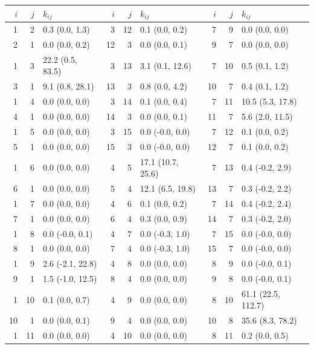 \begin{table}
 \centering
 \label{tab:base_case_rate_matrix}
 \begin{tabular}{|rrl||rrl||rrl|}
 \hline
 $i$ & $j$ &  $k_{ij}$ & $i$ & $j$ &  $k_{ij}$ & $i$ & $j$ &  $k_{ij}$ \\
 \hline\hline
 1 & 2 & 0.3 (0.0, 1.3) & 3 & 12 & 0.1 (0.0, 0.2) & 7 & 9 & 0.0 (0.0, 0.0) \\
 2 & 1 & 0.0 (0.0, 0.2) & 12 & 3 & 0.0 (0.0, 0.1) & 9 & 7 & 0.0 (0.0, 0.0) \\
 1 & 3 & 22.2 (0.5, 83.5) & 3 & 13 & 3.1 (0.1, 12.6) & 7 & 10 & 0.5 (0.1, 1.2) \\
 3 & 1 & 9.1 (0.8, 28.1) & 13 & 3 & 0.8 (0.0, 4.2) & 10 & 7 & 0.4 (0.1, 1.2) \\
 1 & 4 & 0.0 (0.0, 0.0) & 3 & 14 & 0.1 (0.0, 0.4) & 7 & 11 & 10.5 (5.3, 17.8) \\
 4 & 1 & 0.0 (0.0, 0.0) & 14 & 3 & 0.0 (0.0, 0.1) & 11 & 7 & 5.6 (2.0, 11.5) \\
 1 & 5 & 0.0 (0.0, 0.0) & 3 & 15 & 0.0 (-0.0, 0.0) & 7 & 12 & 0.1 (0.0, 0.2) \\
 5 & 1 & 0.0 (0.0, 0.0) & 15 & 3 & 0.0 (-0.0, 0.0) & 12 & 7 & 0.1 (0.0, 0.2) \\
 1 & 6 & 0.0 (0.0, 0.0) & 4 & 5 & 17.1 (10.7, 25.6) & 7 & 13 & 0.4 (-0.2, 2.9) \\
 6 & 1 & 0.0 (0.0, 0.0) & 5 & 4 & 12.1 (6.5, 19.8) & 13 & 7 & 0.3 (-0.2, 2.2) \\
 1 & 7 & 0.0 (0.0, 0.0) & 4 & 6 & 0.1 (0.0, 0.2) & 7 & 14 & 0.4 (-0.2, 2.4) \\
 7 & 1 & 0.0 (0.0, 0.0) & 6 & 4 & 0.3 (0.0, 0.9) & 14 & 7 & 0.3 (-0.2, 2.0) \\
 1 & 8 & 0.0 (-0.0, 0.1) & 4 & 7 & 0.0 (-0.3, 1.0) & 7 & 15 & 0.0 (-0.0, 0.0) \\
 8 & 1 & 0.0 (0.0, 0.0) & 7 & 4 & 0.0 (-0.3, 1.0) & 15 & 7 & 0.0 (-0.0, 0.0) \\
 1 & 9 & 2.6 (-2.1, 22.8) & 4 & 8 & 0.0 (0.0, 0.0) & 8 & 9 & 0.0 (-0.0, 0.1) \\
 9 & 1 & 1.5 (-1.0, 12.5) & 8 & 4 & 0.0 (0.0, 0.0) & 9 & 8 & 0.0 (-0.0, 0.1) \\
 1 & 10 & 0.1 (0.0, 0.7) & 4 & 9 & 0.0 (0.0, 0.0) & 8 & 10 & 61.1 (22.5, 112.7) \\
 10 & 1 & 0.0 (0.0, 0.1) & 9 & 4 & 0.0 (0.0, 0.0) & 10 & 8 & 35.6 (8.3, 78.2) \\
 1 & 11 & 0.0 (0.0, 0.0) & 4 & 10 & 0.0 (0.0, 0.0) & 8 & 11 & 0.2 (0.0, 0.5) \\

\end{tabular}
\end{table}
